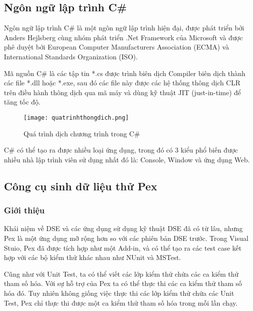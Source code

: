 \subsection{Ngôn ngữ lập trình C\# }

Ngôn ngữ lập trình C\# là một ngôn ngữ lập trình hiện đại, được phát triển bởi Anders Hejlsberg cùng nhóm phát triển .Net Framework của Microsoft và được phê duyệt bởi European Computer Manufacturers Association (ECMA) và International Standards Organization (ISO).

Mã nguồn C\# là các tập tin *.cs được trình biên dịch Compiler biên dịch thành các file *.dll hoặc *.exe, sau đó các file này được các hệ thống thông dịch CLR trên điều hành thông dịch qua mã máy và dùng kỹ thuật JIT (just-in-time) để tăng tốc độ.

\begin{center}
	\begin{figure}[h]
		\begin{center}
			\texttt{[image: quatrinhthongdich.png]}
		\end{center}
		\caption{Quá trình dịch chương trình trong C\#}		
	\end{figure}
\end{center}

C\# có thể tạo ra được nhiều loại ứng dụng, trong đó có 3 kiểu phổ biến được nhiều nhà lập trình viên sử dụng nhất đó là: Console, Window và ứng dụng Web. 

\subsection{Công cụ sinh dữ liệu thử Pex}
\subsubsection*{Giới thiệu}
Khái niệm về DSE và các ứng dụng sử dụng kỹ thuật DSE đã có từ lâu, nhưng Pex là một ứng dụng mỡ rộng hơn so với các phiên bản DSE trước. Trong Visual Stuio, Pex đã được tích hợp như một Add-in, và có thể tạo ra các test case kết hợp với các bộ kiểm thử khác nhau như NUnit và MSTest. 

Cũng như với Unit Test, ta có thể viết các lớp kiểm thử chứa các ca kiểm thử tham số hóa. Với sự hỗ trợ của Pex ta có thể thực thi các ca kiểm thử tham số hóa đó. Tuy nhiên không giống việc thực thi các lớp kiểm thử chứa các Unit Test, Pex chỉ thực thi được một ca kiểm thử tham số hóa trong mỗi lần chạy.



